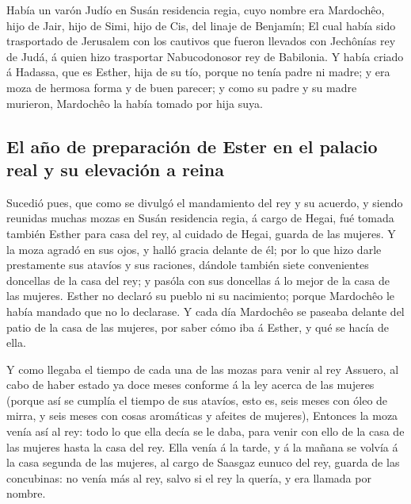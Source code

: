  Había un varón Judío en Susán residencia regia, cuyo
nombre era Mardochêo, hijo de Jair, hijo de Simi, hijo de Cis, del
linaje de Benjamín;  El cual había sido trasportado de
Jerusalem con los cautivos que fueron llevados con Jechônías rey de
Judá, á quien hizo trasportar Nabucodonosor rey de Babilonia.
 Y había criado á Hadassa, que es Esther, hija de su tío,
porque no tenía padre ni madre; y era moza de hermosa forma y de buen
parecer; y como su padre y su madre murieron, Mardochêo la había tomado
por hija suya.

\hypertarget{el-auxf1o-de-preparaciuxf3n-de-ester-en-el-palacio-real-y-su-elevaciuxf3n-a-reina}{%
\subsection{El año de preparación de Ester en el palacio real y su
elevación a
reina}\label{el-auxf1o-de-preparaciuxf3n-de-ester-en-el-palacio-real-y-su-elevaciuxf3n-a-reina}}

 Sucedió pues, que como se divulgó el mandamiento del rey
y su acuerdo, y siendo reunidas muchas mozas en Susán residencia regia,
á cargo de Hegai, fué tomada también Esther para casa del rey, al
cuidado de Hegai, guarda de las mujeres.  Y la moza agradó
en sus ojos, y halló gracia delante de él; por lo que hizo darle
prestamente sus atavíos y sus raciones, dándole también siete
convenientes doncellas de la casa del rey; y pasóla con sus doncellas á
lo mejor de la casa de las mujeres.  Esther no declaró su
pueblo ni su nacimiento; porque Mardochêo le había mandado que no lo
declarase.  Y cada día Mardochêo se paseaba delante del
patio de la casa de las mujeres, por saber cómo iba á Esther, y qué se
hacía de ella.

 Y como llegaba el tiempo de cada una de las mozas para
venir al rey Assuero, al cabo de haber estado ya doce meses conforme á
la ley acerca de las mujeres (porque así se cumplía el tiempo de sus
atavíos, esto es, seis meses con óleo de mirra, y seis meses con cosas
aromáticas y afeites de mujeres),  Entonces la moza venía
así al rey: todo lo que ella decía se le daba, para venir con ello de la
casa de las mujeres hasta la casa del rey.  Ella venía á
la tarde, y á la mañana se volvía á la casa segunda de las mujeres, al
cargo de Saasgaz eunuco del rey, guarda de las concubinas: no venía más
al rey, salvo si el rey la quería, y era llamada por nombre.


